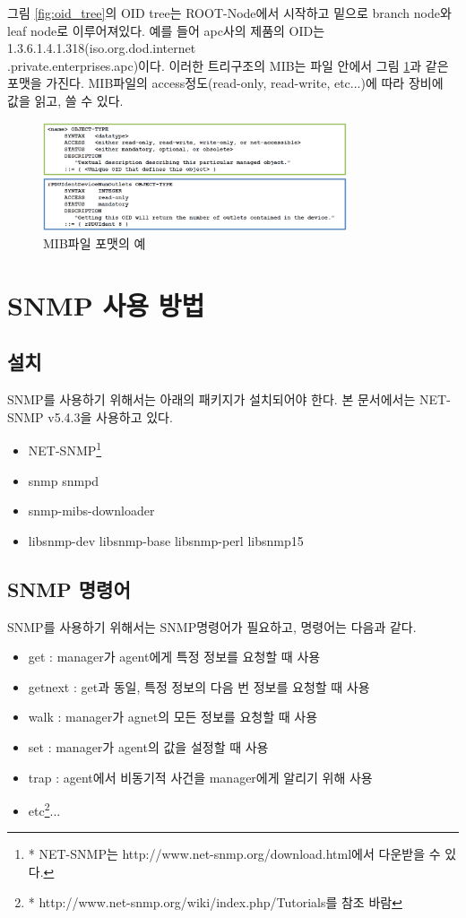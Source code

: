 \documentclass[11pt
  , a4paper
  , article
  , oneside
]{memoir}
\begin{document}
그림 \ref{fig:oid_tree}의 OID tree는 ROOT-Node에서 시작하고 밑으로 branch node와 leaf node로 이루어져있다. 예를 들어 apc사의 제품의 OID는 1.3.6.1.4.1.318(iso.org.dod.internet\\.private.enterprises.apc)이다. 이러한 트리구조의 MIB는 파일 안에서 그림 \ref{fig:ex_mib}과 같은 포맷을 가진다. MIB파일의 access정도(read-only, read-write, etc...)에 따라 장비에 값을 읽고, 쓸 수 있다.

\begin{figure}[h!]
  \centering
  \includegraphics[width=0.8\textwidth]{./images/ex_mib.eps}
  \caption{MIB파일 포맷의 예}
  \label{fig:ex_mib}   
\end{figure}

\chapter{SNMP 사용 방법}
\section{설치}
SNMP를 사용하기 위해서는 아래의 패키지가 설치되어야 한다. 본 문서에서는 NET-SNMP\citep{net_snmp} v5.4.3을 사용하고 있다.
\begin{itemize}
\item NET-SNMP\footnote{* NET-SNMP는 http://www.net-snmp.org/download.html에서 다운받을 수 있다.}
\item snmp snmpd
\item snmp-mibs-downloader
\item libsnmp-dev libsnmp-base libsnmp-perl libsnmp15 
\end{itemize}


\section{SNMP 명령어}

SNMP를 사용하기 위해서는 SNMP명령어\citep{snmp_command}가 필요하고, 명령어는 다음과 같다.
\begin{itemize}
\item get : manager가 agent에게 특정 정보를 요청할 때 사용
\item getnext : get과 동일, 특정 정보의 다음 번 정보를 요청할 때 사용
\item walk : manager가 agnet의 모든 정보를 요청할 때 사용
\item set : manager가 agent의 값을 설정할 때 사용
\item trap : agent에서 비동기적 사건을 manager에게 알리기 위해 사용
\item etc\footnote{* http://www.net-snmp.org/wiki/index.php/Tutorials를 참조 바람}...
\end{itemize}
\end{document}
